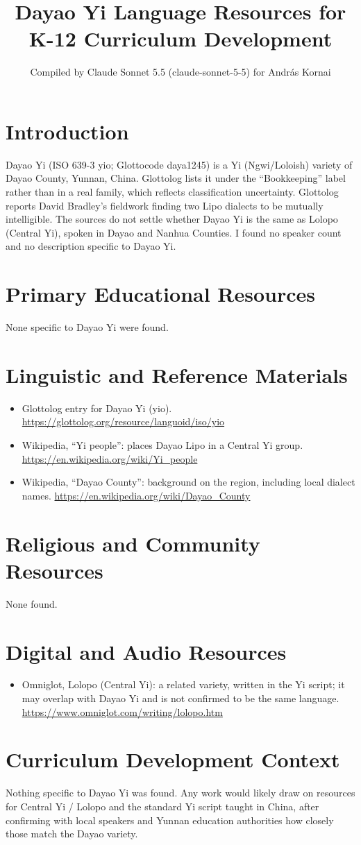 \documentclass[12pt]{article}
\title{Dayao Yi Language Resources for K-12 Curriculum Development}
\author{Compiled by Claude Sonnet 5.5 (claude-sonnet-5-5) for Andr\'as Kornai}
\date{}
\begin{document}
\maketitle

\section{Introduction}
Dayao Yi (ISO 639-3 yio; Glottocode daya1245) is a Yi (Ngwi/Loloish) variety of Dayao County, Yunnan, China. Glottolog lists it under the ``Bookkeeping'' label rather than in a real family, which reflects classification uncertainty. Glottolog reports David Bradley's fieldwork finding two Lipo dialects to be mutually intelligible. The sources do not settle whether Dayao Yi is the same as Lolopo (Central Yi), spoken in Dayao and Nanhua Counties. I found no speaker count and no description specific to Dayao Yi.

\section{Primary Educational Resources}
None specific to Dayao Yi were found.

\section{Linguistic and Reference Materials}
\begin{itemize}
\item Glottolog entry for Dayao Yi (yio). \url{https://glottolog.org/resource/languoid/iso/yio}
\item Wikipedia, ``Yi people'': places Dayao Lipo in a Central Yi group. \url{https://en.wikipedia.org/wiki/Yi_people}
\item Wikipedia, ``Dayao County'': background on the region, including local dialect names. \url{https://en.wikipedia.org/wiki/Dayao_County}
\end{itemize}

\section{Religious and Community Resources}
None found.

\section{Digital and Audio Resources}
\begin{itemize}
\item Omniglot, Lolopo (Central Yi): a related variety, written in the Yi script; it may overlap with Dayao Yi and is not confirmed to be the same language. \url{https://www.omniglot.com/writing/lolopo.htm}
\end{itemize}

\section{Curriculum Development Context}
Nothing specific to Dayao Yi was found. Any work would likely draw on resources for Central Yi / Lolopo and the standard Yi script taught in China, after confirming with local speakers and Yunnan education authorities how closely those match the Dayao variety.
\end{document}
